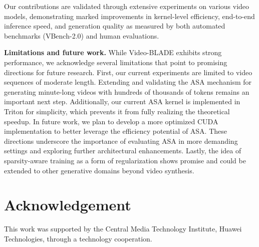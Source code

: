 \documentclass[letterpaper]{article} %
\begin{document}
Our contributions are validated through extensive experiments on various video models, demonstrating marked improvements in kernel-level efficiency, end-to-end inference speed, and generation quality as measured by both automated benchmarks (VBench-2.0) and human evaluations.

\noindent\textbf{Limitations and future work.} While Video-BLADE exhibits strong performance, we acknowledge several limitations that point to promising directions for future research. First, our current experiments are limited to video sequences of moderate length. Extending and validating the ASA mechanism for generating minute-long videos with hundreds of thousands of tokens remains an important next step. Additionally, our current ASA kernel is implemented in Triton for simplicity, which prevents it from fully realizing the theoretical speedup. In future work, we plan to develop a more optimized CUDA implementation to better leverage the efficiency potential of ASA. These directions underscore the importance of evaluating ASA in more demanding settings and exploring further architectural enhancements. Lastly, the idea of sparsity-aware training as a form of regularization shows promise and could be extended to other generative domains beyond video synthesis.

\section{Acknowledgement}
This work was supported by the Central Media Technology Institute, Huawei Technologies, through a technology cooperation.







% 
\end{document}
